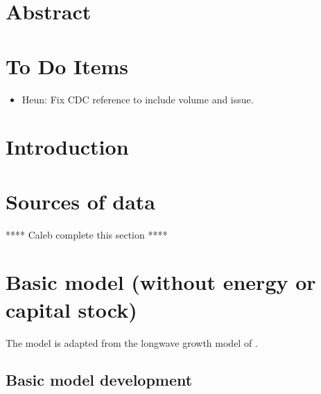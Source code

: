 \documentclass[letterpaper,12pt]{article}
\begin{document}

\section*{Abstract}


\section*{To Do Items}

\begin{itemize}
\item{Heun: Fix CDC reference to include volume and issue.} 

\end{itemize}




\section{Introduction}
\label{sec:introduction}


\section{Sources of data}
\label{sec:sources_of_data}

**** Caleb complete this section ****


\section{Basic model (without energy or capital stock)}
\label{sec:basic_model}

The model is adapted from the longwave growth model of \citet{Jones:2001wn}. 

\subsection{Basic model development}
\label{sec:basic_model_development}
\end{document}
